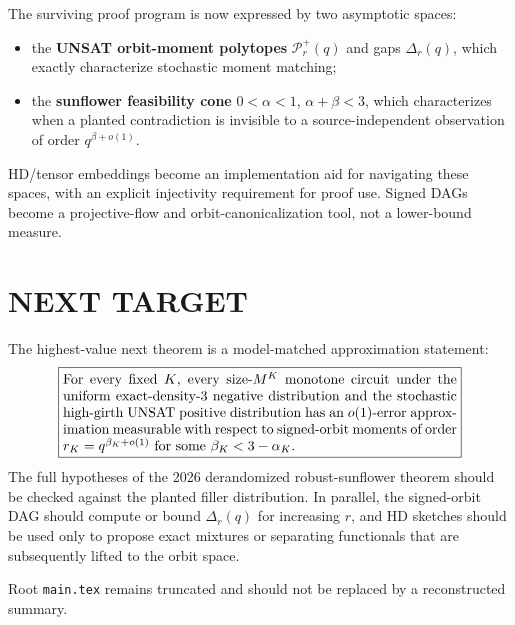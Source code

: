 \documentclass[11pt]{article}
\begin{document}
The surviving proof program is now expressed by two asymptotic spaces:
\begin{itemize}
\item[] the \textbf{UNSAT orbit-moment polytopes} $\mathcal P_r^+(q)$ and gaps $\Delta_r(q)$, which exactly characterize stochastic moment matching;
\item[] the \textbf{sunflower feasibility cone} $0<\alpha<1$, $\alpha+\beta<3$, which characterizes when a planted contradiction is invisible to a source-independent observation of order $q^{\beta+o(1)}$.
\end{itemize}
HD/tensor embeddings become an implementation aid for navigating these spaces, with an explicit injectivity requirement for proof use. Signed DAGs become a projective-flow and orbit-canonicalization tool, not a lower-bound measure.

\section{NEXT TARGET}
The highest-value next theorem is a model-matched approximation statement:
\[
\boxed{
\begin{minipage}{0.82\linewidth}
For every fixed $K$, every size-$M^K$ monotone circuit under the uniform exact-density-3 negative distribution and the stochastic high-girth UNSAT positive distribution has an $o(1)$-error approximation measurable with respect to signed-orbit moments of order $r_K=q^{\beta_K+o(1)}$ for some $\beta_K<3-\alpha_K$.
\end{minipage}}
\]
The full hypotheses of the 2026 derandomized robust-sunflower theorem should be checked against the planted filler distribution. In parallel, the signed-orbit DAG should compute or bound $\Delta_r(q)$ for increasing $r$, and HD sketches should be used only to propose exact mixtures or separating functionals that are subsequently lifted to the orbit space.

Root \texttt{main.tex} remains truncated and should not be replaced by a reconstructed summary.
\end{document}
